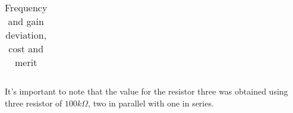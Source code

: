 \vspace{5mm}
\begin{table}[H]
	\centering
	\begin{tabularx}{0.9\textwidth} {
 	    | >{\raggedright\arraybackslash}X
  	    | >{\raggedleft\arraybackslash}X | }
	\hline
	
	\end{tabularx}
	\caption{Frequency and gain deviation, cost and merit}
	\label{tab:currents}
\end{table}

\par It's important to note that the value for the resistor three was obtained using three resistor of $100k\Omega$, two in parallel with one in series.

\vspace{5mm}

